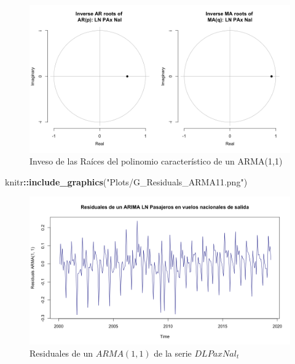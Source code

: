 \documentclass[
]{book}
\newenvironment{Shaded}{\begin{snugshade}}{\end{snugshade}}
\newcommand{\FunctionTok}[1]{\textcolor[rgb]{0.13,0.29,0.53}{\textbf{#1}}}
\newcommand{\NormalTok}[1]{#1}
\newcommand{\SpecialCharTok}[1]{\textcolor[rgb]{0.81,0.36,0.00}{\textbf{#1}}}
\newcommand{\StringTok}[1]{\textcolor[rgb]{0.31,0.60,0.02}{#1}}
\begin{document}
\begin{figure}

{\centering \includegraphics[width=0.95\linewidth]{Plots/G_Roots_ARMA11} 

}

\caption{Inveso de las Raíces del polinomio característico de un ARMA(1,1)}\label{fig:fig412}
\end{figure}

\begin{Shaded}
\begin{Highlighting}[]
\NormalTok{knitr}\SpecialCharTok{::}\FunctionTok{include\_graphics}\NormalTok{(}\StringTok{"Plots/G\_Residuals\_ARMA11.png"}\NormalTok{) }
\end{Highlighting}
\end{Shaded}

\begin{figure}

{\centering \includegraphics[width=0.95\linewidth]{Plots/G_Residuals_ARMA11} 

}

\caption{Residuales de un $ARMA(1, 1)$ de la serie $DLPaxNal_t$}\label{fig:fig413}
\end{figure}
\end{document}
